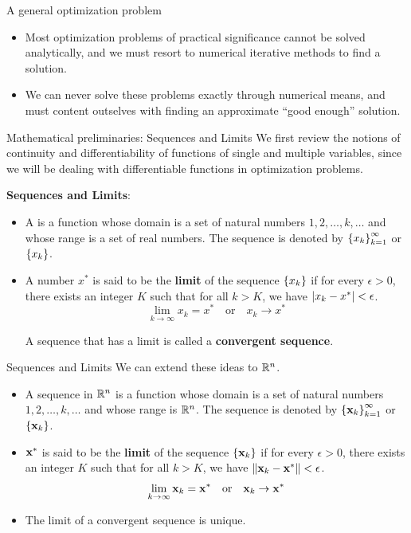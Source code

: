 \documentclass[aspectratio=169]{beamer}
\let\olditem\item
\renewcommand{\item}{\setlength{\itemsep}{\fill}\olditem}
\def\mf{\ensuremath\mathbf}
\def\mb{\ensuremath\mathbb}
\def\lv{\ensuremath\left\lvert}
\def\rv{\ensuremath\right\rvert}
\def\lV{\ensuremath\left\lVert}
\def\rV{\ensuremath\right\rVert}
\def\lc{\ensuremath\left\{}
\def\rc{\ensuremath\right\}}
\def\R{\ensuremath\mb{R}}
\begin{document}
\begin{frame}[t]{A general optimization problem}
\begin{itemize}
  \item Most optimization problems of practical significance cannot be solved analytically, and we must resort to numerical iterative methods to find a solution.
  
  \item We can never solve these problems exactly through numerical means, and must content outselves with finding an approximate ``good enough'' solution.
\end{itemize}
\end{frame}


\begin{frame}[t]{Mathematical preliminaries: Sequences and Limits}
  We first review the notions of continuity and differentiability of functions of single and multiple variables, since we will be dealing with differentiable functions in optimization problems.
  \vspace{0.2cm}

  \textbf{Sequences and Limits}:
  \begin{itemize}
    \item A  is a function whose domain is a set of natural numbers $1, 2, \ldots, k, \ldots$ and whose range is a set of real numbers. The sequence is denoted by $\lc x_k\rc_{k=1}^{\infty}$ or $\lc x_k \rc$.
    \vspace{0.25cm}
  
    \item A number $x^{*}$ is said to be the \textbf{limit} of the sequence $\lc x_k \rc$ if for every $\epsilon > 0$, there exists an integer $K$ such that for all $k > K$, we have $\lv x_k - x^{*} \rv < \epsilon$.
    \[ \lim_{k \to \infty} x_k = x^* \quad \mathrm{or} \quad x_k \to x^* \]

    A sequence that has a limit is called a \textbf{convergent sequence}.
  \end{itemize}
\end{frame}


\begin{frame}[t]{Sequences and Limits}
  We can extend these ideas to $\R^n$.
  \begin{itemize}
    \item A sequence in $\R^n$ is a function whose domain is a set of natural numbers $1, 2, \ldots, k, \ldots$ and whose range is $\R^n$. The sequence is denoted by $\lc \mf{x}_k\rc_{k=1}^{\infty}$ or $\lc \mf{x}_k \rc$.
    \vspace{0.25cm}
  
    \item $\mf{x}^{*}$ is said to be the \textbf{limit} of the sequence $\lc \mf{x}_k \rc$ if for every $\epsilon > 0$, there exists an integer $K$ such that for all $k > K$, we have $\lV \mf{x}_k - \mf{x}^{*} \rV < \epsilon$.
    \[ \lim_{k \to \infty} \mf{x}_k = \mf{x}^* \quad \mathrm{or} \quad \mf{x}_k \to \mf{x}^* \]

    \item The limit of a convergent sequence is unique.
  \end{itemize}
\end{frame}
\end{document}
